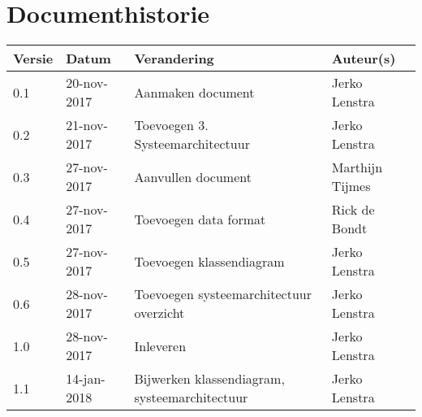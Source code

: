 \section{Documenthistorie}

\begin{tabularx}{\textwidth}{| l | l | X | l |}
	\hline
	\textbf{Versie} & \textbf{Datum} & \textbf{Verandering} & \textbf{Auteur(s)} \\ \hline
	0.1	& 20-nov-2017 & Aanmaken document & Jerko Lenstra \\ \hline
    0.2 & 21-nov-2017 & Toevoegen 3. Systeemarchitectuur & Jerko Lenstra \\ \hline
    0.3 & 27-nov-2017 & Aanvullen document & Marthijn Tijmes \\ \hline
    0.4 & 27-nov-2017 & Toevoegen data format & Rick de Bondt \\ \hline
    0.5 & 27-nov-2017 & Toevoegen klassendiagram & Jerko Lenstra \\ \hline
    0.6 & 28-nov-2017 & Toevoegen systeemarchitectuur overzicht & Jerko Lenstra \\ \hline
    1.0 & 28-nov-2017 & Inleveren & Jerko Lenstra \\ \hline
    1.1 & 14-jan-2018 & Bijwerken klassendiagram, systeemarchitectuur & Jerko Lenstra \\ \hline

\end{tabularx}
